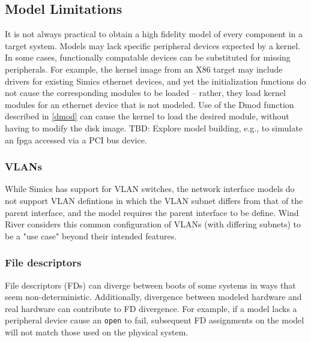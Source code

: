 \documentclass[titlepage]{article}
\begin{document}
\begin{appendices}
\subsection{Model Limitations}
It is not always practical to obtain a high fidelity model of every component in a target system.  
Models may lack specific peripheral devices expected by a kernel.  In some cases, functionally
compatable devices can be substituted for missing peripherals.  For example, the kernel image from an
X86 target may include drivers for existing Simics ethernet devices, and yet the initialization functions
do not cause the corresponding modules to be loaded -- rather, they load kernel modules for an ethernet 
device that is not modeled.  Use of the Dmod function described in \ref{dmod} can cause the kernel
to load the desired module, without having to modify the disk image.  
TBD: Explore model building, e.g., to simulate an fpga accessed via a PCI bus device.

\subsubsection{VLANs}
While Simics has support for VLAN switches, the network interface models do not support
VLAN defintions in which the VLAN subnet differs from that of the parent interface, and the model
requires the parent interface to be define.  Wind River considers this common configuration
of VLANs (with differing subnets) to be a "use case" beyond their intended features.

\subsubsection{File descriptors}
File descriptors (FDs) can diverge between boots of some systems in ways that seem non-deterministic.
Additionally, divergence between modeled hardware and real hardware can contribute to FD divergence.
For example, if a model lacks a peripheral device cause an {\tt open} to fail, subsequent FD assignments
on the model will not match those used on the physical system.  


\end{appendices}
\end{document}
